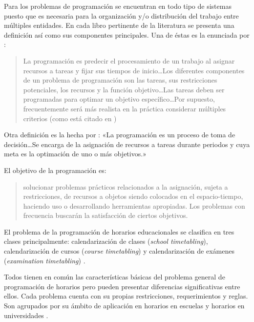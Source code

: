 \documentclass[spanish,draft,12pt,headsepline,footsepline,paper=letter]{scrreprt}
\begin{document}
Para \citet[p.~5]{TKindt2002} los problemas de programación se encuentran en todo tipo de sistemas puesto que es necesaria para la organización y/o distribución del trabajo entre múltiples entidades. En cada libro pertinente de la literatura se presenta una definición así como sus componentes principales. Una de éstas es la enunciada por \citet{carlier1988problemes}: 
\begin{quotation}
La programación es predecir el procesamiento de un trabajo al asignar recursos a tareas y fijar sus tiempos de inicio\ldots Los diferentes componentes de un problema de programación son las tareas, sus restricciones potenciales, los recursos y la función objetivo\ldots Las tareas deben ser programadas para optimar un objetivo específico\ldots Por supuesto, frecuentemente será más realista en la práctica considerar múltiples criterios (como está citado en \citealp[p.~6]{TKindt2002}) 
\end{quotation}

Otra definición es la hecha por \citet[p.~1]{Pinedo1995}: «La programación es un proceso de toma de decisión\ldots  Se encarga de la asignación de recursos a tareas durante periodos y cuya meta es la optimación de uno o más objetivos.»

El objetivo de la programación es:

\begin{quotation}
  solucionar problemas prácticos relacionados a la asignación, sujeta a restricciones, de recursos a objetos siendo colocados en el espacio-tiempo, haciendo uso o desarrollando herramientas apropiadas. Los problemas con frecuencia buscarán la satisfacción de ciertos objetivos.
\end{quotation}


El problema de la programación de horarios educacionales se clasifica en tres clases principalmente:
calendarización de clases (\textit{school timetabling}),
calendarización de cursos (\textit{course timetabling}) y
calendarización de exámenes (\textit{examination timetabling}) \citep[p.~88]{schaerf99a-survey-of-automated}.

Todos tienen en común las características básicas del problema general de programación de horarios pero pueden presentar diferencias significativas entre ellos. Cada problema cuenta con su propias restricciones, requerimientos y reglas. Son agrupados por su ámbito de aplicación en horarios en escuelas y horarios en universidades \citep[p.~10]{abdullah06heuristic-approaches}.
\end{document}
